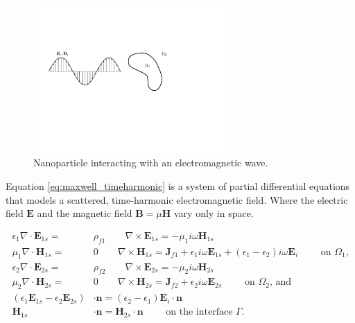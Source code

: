 \begin{figure}%
   \centering
   \includegraphics[width=0.65\textwidth]{particle_wave.pdf} 
   \caption{Nanoparticle interacting with an electromagnetic wave.}
   \label{fig:part_wave}
\end{figure}


Equation \eqref{eq:maxwell_timeharmonic} is a system of partial differential equations that
models a scattered, time-harmonic electromagnetic field. Where the electric field $\mathbf{E}$ and 
the magnetic field $\mathbf{B} = \mu \mathbf{H}$ vary only in space. 

\begin{align} \label{eq:maxwell_timeharmonic}
   \epsilon_1 \nabla \cdot \mathbf{E}_{1s} =& \rho_{f1} \qquad \nabla \times \mathbf{E}_{1s} = -\mu_1i\omega\mathbf{H}_{1s} \nonumber \\
   \mu_1\nabla \cdot \mathbf{H}_{1s} =& 0 \qquad \nabla \times \mathbf{H}_{1s} = \mathbf{J}_{f1} + \epsilon_1i\omega\mathbf{E}_{1s} + (\epsilon_1-\epsilon_2)i\omega\mathbf{E}_{i}\qquad \text{ on $\Omega_1$,} \nonumber \\
   \epsilon_2 \nabla \cdot \mathbf{E}_{2s} =& \rho_{f2} \qquad \nabla \times \mathbf{E}_{2s} = -\mu_2i\omega \mathbf{H}_{2s} \nonumber \\
   \mu_2\nabla \cdot \mathbf{H}_{2s} =& 0 \qquad \nabla \times \mathbf{H}_{2s} = \mathbf{J}_{f2} + \epsilon_2i\omega\mathbf{E}_{2s} \qquad \text{ on $\Omega_2$, and} \nonumber \\
   (\epsilon_1\mathbf{E}_{1s}-\epsilon_2\mathbf{E}_{2s})&\cdot\mathbf{n} = (\epsilon_2-\epsilon_1)\mathbf{E}_i\cdot\mathbf{n} \nonumber \\
   \mathbf{H}_{1s}&\cdot \mathbf{n} = \mathbf{H}_{2s}\cdot\mathbf{n} \qquad\text{ on the interface $\Gamma$}.
\end{align} 

